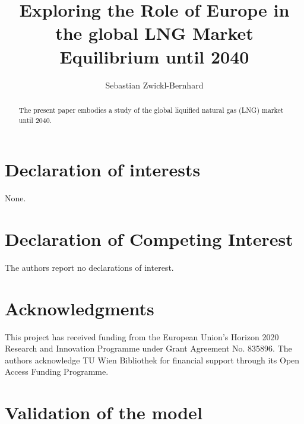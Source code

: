 \documentclass[review]{elsarticle}
\begin{document}
\begin{frontmatter}

\title{Exploring the Role of Europe in the global LNG Market Equilibrium until 2040}
\author[1,2]{Sebastian Zwickl-Bernhard}
\address[1]{Energy Economics Group (EEG), Technische Universität Wien, Gusshausstrasse 25-29/E370-3, 1040 Wien, Austria}
\address[2]{Department of Industrial Economics and Technology Management, \protect\\ The Norwegian University of Science and Technology, Trondheim, Norway}


\begin{abstract}
	The present paper embodies a study of the global liquified natural gas (LNG) market until 2040. 
\end{abstract}

\begin{keyword}	
\end{keyword}
\end{frontmatter}
\newpage






\section*{Declaration of interests}
None.
\section*{Declaration of Competing Interest}
The authors report no declarations of interest.
\section*{Acknowledgments}
This project has received funding from the European Union's Horizon 2020 Research and Innovation Programme under Grant Agreement No. 835896. The authors acknowledge TU Wien Bibliothek for financial support through its Open Access Funding Programme.

\appendix
\setcounter{table}{0}
\setcounter{figure}{0}
\section{Validation of the model}\label{appendix:validation}
\end{document}
